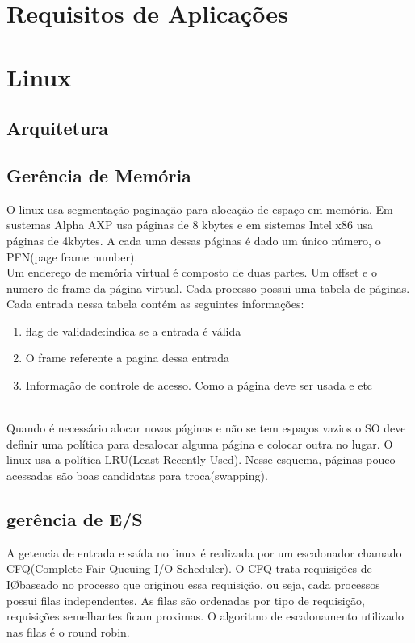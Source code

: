 \documentclass[conference]{IEEEtran}
\begin{document}
\section{Requisitos de Aplicações}\label{sec:req}

\section{Linux}\label{sec:linux}

\subsection{Arquitetura}\label{sec:LinuxArq}

\subsection{Gerência de Memória}\label{sec:LinuxMem}

O linux usa segmentação-paginação para alocação de espaço em memória. Em sustemas Alpha AXP usa páginas de 8 kbytes e em sistemas Intel x86 usa páginas de 4kbytes. A cada uma dessas páginas é dado um único número, o PFN(page frame number)\cite{GerenciaMemLinux}.\\

Um endereço de memória virtual é composto de duas partes. Um offset e o numero de frame da página virtual. Cada processo possui uma tabela de páginas. Cada entrada nessa tabela contém as seguintes informações:\\

\begin{enumerate}
	\item flag de validade:indica se a entrada é válida
	\item O frame referente a pagina dessa entrada
	\item Informação de controle de acesso. Como a página deve ser usada e etc
\end{enumerate}
\cite{GerenciaMemLinux}
\\

Quando é necessário alocar novas páginas e não se tem espaços vazios o SO deve definir uma política para desalocar alguma página e colocar outra no lugar. O linux usa a política LRU(Least Recently Used). Nesse esquema, páginas pouco acessadas são boas candidatas para troca(swapping)\cite{GerenciaIOLinux}.

\subsection{gerência de E/S}\label{sec:LinuxES}
A getencia de entrada e saída no linux é realizada por um escalonador chamado CFQ(Complete Fair Queuing I/O Scheduler). O CFQ trata requisições de I\O baseado no processo que originou essa requisição, ou seja, cada processos possui filas independentes. As filas são ordenadas por tipo de requisição, requisições semelhantes ficam proximas. O algoritmo de escalonamento utilizado nas filas é o round robin\cite{GerenciaIOLinuxSS}.
\end{document}
